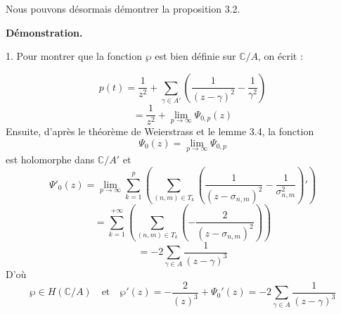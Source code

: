 \documentclass{article}
\begin{document}
Nous pouvons désormais démontrer la proposition 3.2.

\textbf{Démonstration.}

1. Pour montrer que la fonction \( \wp \) est bien définie sur \( \mathbb{C}/A \), on écrit :

\[
p(t) = \frac{1}{z^2} + \sum_{\gamma \in A'} \left( \frac{1}{(z - \gamma)^2} - \frac{1}{\gamma^2} \right)
\]
\[
= \frac{1}{z^2} + \lim_{p \to \infty} \Psi_{0,p}(z)
\]
Ensuite, d'après le théorème de Weierstrass et le lemme 3.4, la fonction
\[
\Psi_{0}(z) = \lim_{p \to \infty} \Psi_{0,p}
\]
est holomorphe dans \( \mathbb{C}/A' \) et
\[
\Psi'_{0}(z) = \lim_{p \to \infty} \sum_{k=1}^{p} \left( \sum_{(n,m) \in T_k} \left( \frac{1}{(z - \sigma_{n,m})^2} - \frac{1}{\sigma_{n,m}^2} \right)' \right)
\]
\[
= \sum_{k=1}^{ + \infty} \left( \sum_{(n,m) \in T_k} \left( -\frac{2}{(z - \sigma_{n,m})^2} \right) \right)
\]
\[
= -2 \sum_{\gamma \in A} \frac{1}{(z - \gamma)^3}
\]
D'où
\[
\wp \in H( \mathbb{C}/A) \quad \text{et} \quad \wp'(z) = -\frac{2}{(z)^3} + \Psi_0'(z) = -2 \sum_{\gamma \in A} \frac{1}{(z - \gamma)^3}
\]
\end{document}
